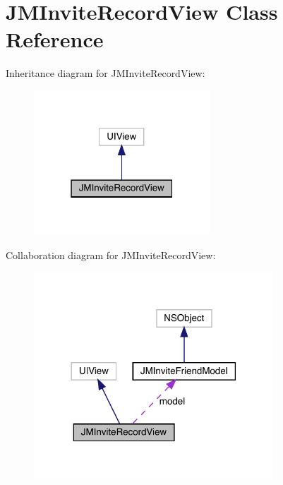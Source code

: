 \hypertarget{interface_j_m_invite_record_view}{}\section{J\+M\+Invite\+Record\+View Class Reference}
\label{interface_j_m_invite_record_view}


Inheritance diagram for J\+M\+Invite\+Record\+View\+:\nopagebreak
\begin{figure}[H]
\begin{center}
\leavevmode
\includegraphics[width=187pt]{interface_j_m_invite_record_view__inherit__graph}
\end{center}
\end{figure}


Collaboration diagram for J\+M\+Invite\+Record\+View\+:\nopagebreak
\begin{figure}[H]
\begin{center}
\leavevmode
\includegraphics[width=254pt]{interface_j_m_invite_record_view__coll__graph}
\end{center}
\end{figure}
